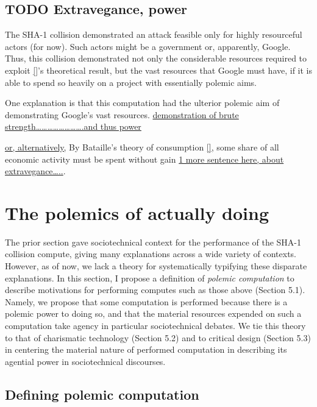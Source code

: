 \documentclass[sigconf]{acmart}
\begin{document}
\subsection{{\bfseries\sffamily TODO} Extravegance, power}
\label{sec:org38ae442}

The SHA-1 collision demonstrated an attack feasible only for highly resourceful actors (for now). 
Such actors might be a government or, apparently, Google.
Thus, this collision demonstrated not only the considerable resources required to exploit \uline{[]}'s theoretical result,
but the vast resources that Google must have, if it is able to spend so heavily on a project with essentially polemic aims.

One explanation is that this computation had the ulterior polemic aim of demonstrating Google's vast resources.
\uline{demonstration of brute strength\ldots{}\ldots{}\ldots{}\ldots{}\ldots{}\ldots{}\ldots{}\ldots{}.and thus power}

\uline{or, alternatively,}
By Bataille's theory of consumption \uline{[]}, some share of all economic activity must be spent without gain 
\uline{1 more sentence here, about extravegance\ldots{}..}.


\section{The polemics of actually doing}
\label{sec:org93057b3}

The prior section gave sociotechnical context for the performance of the SHA-1 collision compute,
giving many explanations across a wide variety of contexts.
However, as of now, we lack a theory for systematically typifying these disparate explanations.
In this section, I propose a definition of \emph{polemic computation} to describe motivations for performing computes such as those above (Section 5.1).
Namely, we propose that some computation is performed because there is a polemic power to doing so, 
and that the material resources expended on such a computation take agency in particular sociotechnical debates.
We tie this theory to that of charismatic technology (Section 5.2)
and to critical design (Section 5.3)
in centering the material nature of performed computation
in describing its agential power in sociotechnical discourses.

\subsection{Defining polemic computation}
\label{sec:org726fca6}
\end{document}
